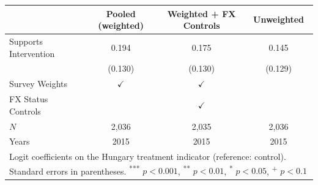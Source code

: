 \begin{tabular}{l*{3}{c}}
\toprule
 & Pooled (weighted) & Weighted + FX Controls & Unweighted \\
\midrule
Supports Intervention & 0.194 & 0.175 & 0.145 \\
 & (0.130) & (0.130) & (0.129) \\
\midrule
Survey Weights & $\checkmark$ & $\checkmark$ &  \\
FX Status Controls &  & $\checkmark$ &  \\
\midrule
$N$ & 2,036 & 2,035 & 2,036 \\
Years & 2015 & 2015 & 2015 \\
\bottomrule
\multicolumn{4}{p{\linewidth}}{\footnotesize Logit coefficients on the Hungary treatment indicator (reference: control). Standard errors in parentheses. \textsuperscript{***} $p<0.001$, \textsuperscript{**} $p<0.01$, \textsuperscript{*} $p<0.05$, \textsuperscript{+} $p<0.1$} \\
\end{tabular}
